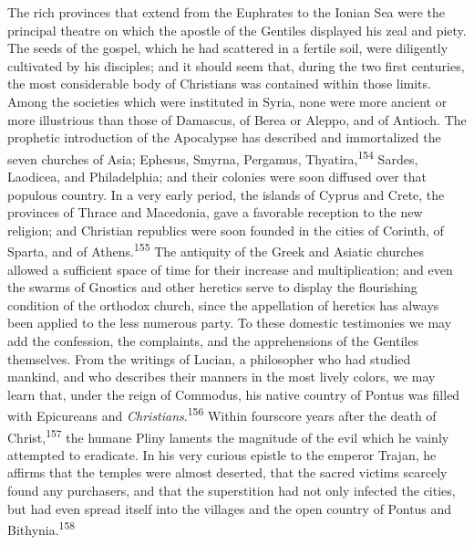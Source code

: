 The rich provinces that extend from the Euphrates to the Ionian
Sea were the principal theatre on which the apostle of the
Gentiles displayed his zeal and piety. The seeds of the gospel,
which he had scattered in a fertile soil, were diligently
cultivated by his disciples; and it should seem that, during the
two first centuries, the most considerable body of Christians was
contained within those limits. Among the societies which were
instituted in Syria, none were more ancient or more illustrious
than those of Damascus, of Berea or Aleppo, and of Antioch. The
prophetic introduction of the Apocalypse has described and
immortalized the seven churches of Asia; Ephesus, Smyrna,
Pergamus, Thyatira,\textsuperscript{154} Sardes, Laodicea, and Philadelphia; and
their colonies were soon diffused over that populous country. In
a very early period, the islands of Cyprus and Crete, the
provinces of Thrace and Macedonia, gave a favorable reception to
the new religion; and Christian republics were soon founded in
the cities of Corinth, of Sparta, and of Athens.\textsuperscript{155} The
antiquity of the Greek and Asiatic churches allowed a sufficient
space of time for their increase and multiplication; and even the
swarms of Gnostics and other heretics serve to display the
flourishing condition of the orthodox church, since the
appellation of heretics has always been applied to the less
numerous party. To these domestic testimonies we may add the
confession, the complaints, and the apprehensions of the Gentiles
themselves. From the writings of Lucian, a philosopher who had
studied mankind, and who describes their manners in the most
lively colors, we may learn that, under the reign of Commodus,
his native country of Pontus was filled with Epicureans and
\textit{Christians}.\textsuperscript{156} Within fourscore years after the death of
Christ,\textsuperscript{157} the humane Pliny laments the magnitude of the evil
which he vainly attempted to eradicate. In his very curious
epistle to the emperor Trajan, he affirms that the temples were
almost deserted, that the sacred victims scarcely found any
purchasers, and that the superstition had not only infected the
cities, but had even spread itself into the villages and the open
country of Pontus and Bithynia.\textsuperscript{158}


